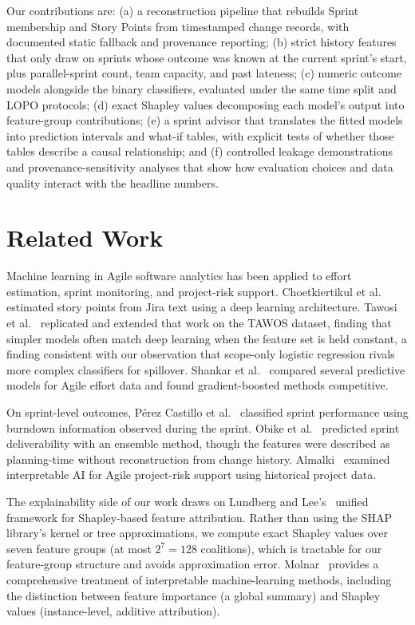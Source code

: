 \documentclass[conference]{IEEEtran}
\begin{document}
Our contributions are:
(a) a reconstruction pipeline that rebuilds Sprint membership and Story Points from timestamped change records, with documented static fallback and provenance reporting;
(b) strict history features that only draw on sprints whose outcome was known at the current sprint's start, plus parallel-sprint count, team capacity, and past lateness;
(c) numeric outcome models alongside the binary classifiers, evaluated under the same time split and LOPO protocols;
(d) exact Shapley values decomposing each model's output into feature-group contributions;
(e) a sprint advisor that translates the fitted models into prediction intervals and what-if tables, with explicit tests of whether those tables describe a causal relationship;
and (f) controlled leakage demonstrations and provenance-sensitivity analyses that show how evaluation choices and data quality interact with the headline numbers.

\section{Related Work}

Machine learning in Agile software analytics has been applied to effort estimation, sprint monitoring, and project-risk support.
Choetkiertikul et al.~\cite{choetkiertikul2019} estimated story points from Jira text using a deep learning architecture.
Tawosi et al.~\cite{tawosi2023} replicated and extended that work on the TAWOS dataset, finding that simpler models often match deep learning when the feature set is held constant, a finding consistent with our observation that scope-only logistic regression rivals more complex classifiers for spillover.
Shankar et al.~\cite{shankar2026} compared several predictive models for Agile effort data and found gradient-boosted methods competitive.

On sprint-level outcomes, P\'{e}rez Castillo et al.~\cite{perezcastillo2024} classified sprint performance using burndown information observed during the sprint.
Obike et al.~\cite{obike2025} predicted sprint deliverability with an ensemble method, though the features were described as planning-time without reconstruction from change history.
Almalki~\cite{almalki2025} examined interpretable AI for Agile project-risk support using historical project data.

The explainability side of our work draws on Lundberg and Lee's~\cite{lundberg2017} unified framework for Shapley-based feature attribution.
Rather than using the SHAP library's kernel or tree approximations, we compute exact Shapley values over seven feature groups (at most $2^7 = 128$ coalitions), which is tractable for our feature-group structure and avoids approximation error.
Molnar~\cite{molnar2022} provides a comprehensive treatment of interpretable machine-learning methods, including the distinction between feature importance (a global summary) and Shapley values (instance-level, additive attribution).
\end{document}
